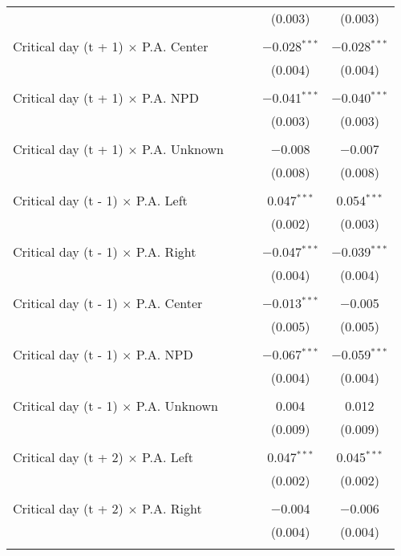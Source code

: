 \documentclass[
]{article}
\begin{document}
\begin{table}[!htbp]
{\begin{tabular}{@{\extracolsep{5pt}}lcccc}
  &  &  & (0.003) & (0.003) \\ 
  & & & & \\ 
 Critical day (t + 1) $\times$ P.A. Center &  &  & $-$0.028$^{***}$ & $-$0.028$^{***}$ \\ 
  &  &  & (0.004) & (0.004) \\ 
  & & & & \\ 
 Critical day (t + 1) $\times$ P.A. NPD &  &  & $-$0.041$^{***}$ & $-$0.040$^{***}$ \\ 
  &  &  & (0.003) & (0.003) \\ 
  & & & & \\ 
 Critical day (t + 1) $\times$ P.A. Unknown &  &  & $-$0.008 & $-$0.007 \\ 
  &  &  & (0.008) & (0.008) \\ 
  & & & & \\ 
 Critical day (t - 1) $\times$ P.A. Left &  &  & 0.047$^{***}$ & 0.054$^{***}$ \\ 
  &  &  & (0.002) & (0.003) \\ 
  & & & & \\ 
 Critical day (t - 1) $\times$ P.A. Right &  &  & $-$0.047$^{***}$ & $-$0.039$^{***}$ \\ 
  &  &  & (0.004) & (0.004) \\ 
  & & & & \\ 
 Critical day (t - 1) $\times$ P.A. Center &  &  & $-$0.013$^{***}$ & $-$0.005 \\ 
  &  &  & (0.005) & (0.005) \\ 
  & & & & \\ 
 Critical day (t - 1) $\times$ P.A. NPD &  &  & $-$0.067$^{***}$ & $-$0.059$^{***}$ \\ 
  &  &  & (0.004) & (0.004) \\ 
  & & & & \\ 
 Critical day (t - 1) $\times$ P.A. Unknown &  &  & 0.004 & 0.012 \\ 
  &  &  & (0.009) & (0.009) \\ 
  & & & & \\ 
 Critical day (t + 2) $\times$ P.A. Left &  &  & 0.047$^{***}$ & 0.045$^{***}$ \\ 
  &  &  & (0.002) & (0.002) \\ 
  & & & & \\ 
 Critical day (t + 2) $\times$ P.A. Right &  &  & $-$0.004 & $-$0.006 \\ 
  &  &  & (0.004) & (0.004) \\ 
  & & & & \\ 

\end{tabular}}
\end{table}
\end{document}
